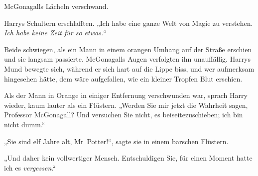 McGonagalls Lächeln verschwand.

Harrys Schultern erschlafften. „Ich habe eine ganze Welt von Magie zu verstehen. \emph{Ich habe keine Zeit für so etwas.}“

Beide schwiegen, als ein Mann in einem orangen Umhang auf der Straße erschien und sie langsam passierte. McGonagalls Augen verfolgten ihn unauffällig. Harrys Mund bewegte sich, während er sich hart auf die Lippe biss, und wer aufmerksam hingesehen hätte, dem wäre aufgefallen, wie ein kleiner Tropfen Blut erschien.

Als der Mann in Orange in einiger Entfernung verschwunden war, sprach Harry wieder, kaum lauter als ein Flüstern. „Werden Sie mir jetzt die Wahrheit sagen, Professor McGonagall? Und versuchen Sie nicht, es beiseitezuschieben; ich bin nicht dumm.“

„Sie sind elf Jahre alt, Mr~Potter!“, sagte sie in einem barschen Flüstern.

„Und daher kein vollwertiger Mensch. Entschuldigen Sie, für einen Moment hatte ich es \emph{vergessen}.“


